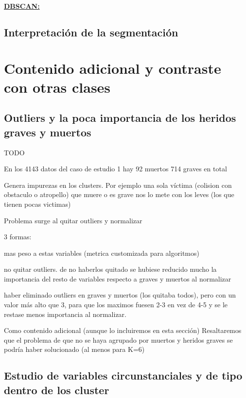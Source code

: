 \documentclass[oneside]{book}
\begin{document}
\href{https://scikit-learn.org/stable/modules/generated/sklearn.cluster.DBSCAN.html}{\textbf{DBSCAN:}}

\subsection{Interpretación de la segmentación}

\section{Contenido adicional y contraste con otras clases}

\subsection{Outliers y la poca importancia de los heridos graves y
  muertos}
TODO

En los 4143 datos del caso de estudio 1 hay 92 muertos
714 graves en total

Genera impurezas en los clusters. Por ejemplo una sola víctima
(colision con obstaculo o atropello) que muere o es grave nos lo mete con los leves (los que tienen pocas victimas)

Problema surge al quitar outliers
y normalizar

3 formas:

mas peso a estas variables (metrica customizada para
algoritmos)

no quitar outliers. de no haberlos quitado se hubiese
reducido mucho la importancia del resto de variables respecto a graves y muertos al normalizar

haber eliminado outliers en graves y muertos (los quitaba todos), pero
con un valor más alto que 3, para que los maximos fuesen 2-3 en vez de
4-5 y se le restase menos importancia al normalizar.

Como contenido adicional (aunque lo incluiremos en esta sección)
Resaltaremos que el problema de que no se haya agrupado por muertos y
heridos graves se podría haber solucionado (al menos para K=6)

\subsection{Estudio de variables circunstanciales y de tipo dentro de
  los cluster}
\end{document}

